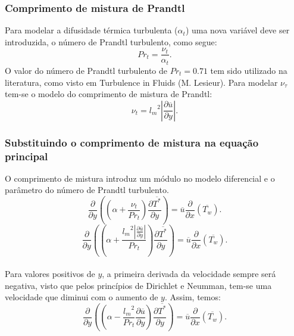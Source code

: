 \documentclass[xcolor=dvipsnames,10pt,aspectratio=169]{beamer}
\begin{document}
	
	
	
		
		\begin{frame}
			\frametitle{Comprimento de mistura de Prandtl}
			Para modelar a difusidade térmica turbulenta ($\alpha_t$) uma nova variável deve ser introduzida, o número de Prandtl turbulento, como segue:
			\begin{equation}
				Pr_t = \frac{\nu_t}{\alpha_t}.
			\end{equation} 
			O valor do número de Prandtl turbulento de $ Pr_t = 0.71$ tem sido utilizado na literatura, como visto em Turbulence in Fluids (M. Lesieur).
			Para modelar $\nu_\tau$ tem-se o modelo do comprimento de mistura de Prandtl:
			\begin{equation}
			\nu_t = {l_m}^2 \left| \frac{\partial \overline{u}}{\partial y} \right|.
			\end{equation}
		\end{frame}
		
		
		
		
		
		\begin{frame}
			\frametitle{Substituindo o comprimento de mistura na equação principal}	
			O comprimento de mistura introduz um módulo no modelo diferencial e o parâmetro do número de Prandtl turbulento.   
			\\
				\begin{equation}
				{\frac{\partial{}}{\partial{y}}} \left( \left( \alpha   
				+ \frac{\nu_t}{Pr_t} \right) \frac{\partial \overline{T^\ast}}{\partial y} \right)
				= 
				\overline{u}\frac{\partial{}}{\partial{x}}\left(\overline{T_w}\right)  .
				\end{equation}
			\begin{equation}
			{\frac{\partial{}}{\partial{y}}} \left( \left( \alpha   
			+ \frac{{l_m}^2 \left| \frac{\partial \overline{u}}{\partial y} \right|}{Pr_t} \right) \frac{\partial \overline{T^\ast}}{\partial y} \right)
			= 
			\overline{u}\frac{\partial{}}{\partial{x}}\left(\overline{T_w}\right)  .
			\end{equation}
		\\
		Para valores positivos de $ y $, a primeira derivada da velocidade sempre será negativa, visto que pelos princípios de Dirichlet e Neumman, tem-se uma velocidade que diminui com o aumento de $ y $. Assim, temos:\\
			\begin{equation}
			{\frac{\partial{}}{\partial{y}}} \left( \left( \alpha   
			- \frac{{l_m}^2}{Pr_t}\frac{\partial \overline{u}}{\partial y} \right) \frac{\partial \overline{T^\ast}}{\partial y} \right)
			= 
			\overline{u}\frac{\partial{}}{\partial{x}}\left(\overline{T_w}\right)  .
			\end{equation}
		\end{frame}	
	
\end{document}
